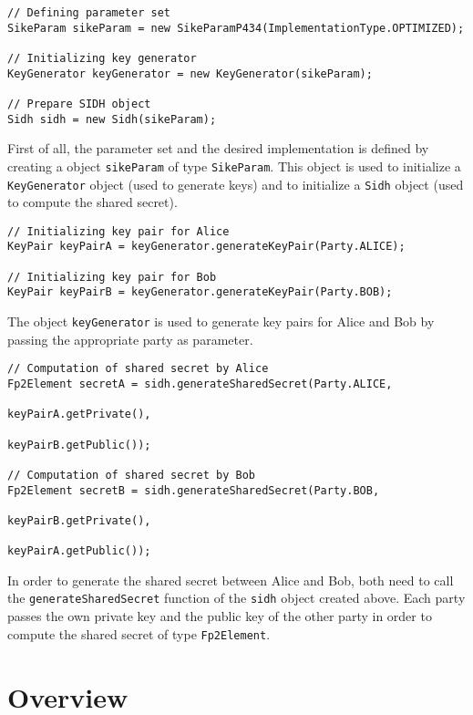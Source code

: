 
\begin{lstlisting}[]
// Defining parameter set
SikeParam sikeParam = new SikeParamP434(ImplementationType.OPTIMIZED);

// Initializing key generator
KeyGenerator keyGenerator = new KeyGenerator(sikeParam);

// Prepare SIDH object
Sidh sidh = new Sidh(sikeParam);
\end{lstlisting}
First of all, the parameter set and the desired implementation is defined by creating a object \texttt{sikeParam} of type \texttt{SikeParam}. This object is used to initialize a \texttt{KeyGenerator} object (used to generate keys) and to initialize a \texttt{Sidh} object (used to compute the shared secret).\\

\begin{lstlisting}[]
// Initializing key pair for Alice
KeyPair keyPairA = keyGenerator.generateKeyPair(Party.ALICE);

// Initializing key pair for Bob
KeyPair keyPairB = keyGenerator.generateKeyPair(Party.BOB);
\end{lstlisting}
The object \texttt{keyGenerator} is used to generate key pairs for Alice and Bob by passing the appropriate party as parameter.\\

\begin{lstlisting}[]
// Computation of shared secret by Alice
Fp2Element secretA = sidh.generateSharedSecret(Party.ALICE,
													keyPairA.getPrivate(), 
													keyPairB.getPublic());

// Computation of shared secret by Bob
Fp2Element secretB = sidh.generateSharedSecret(Party.BOB, 
													keyPairB.getPrivate(), 
													keyPairA.getPublic());
\end{lstlisting}
In order to generate the shared secret between Alice and Bob, both need to call the \texttt{generateSharedSecret} function of the \texttt{sidh} object created above. Each party passes the own private key and the public key of the other party in order to compute the shared secret of type \texttt{Fp2Element}.

\section{Overview}

